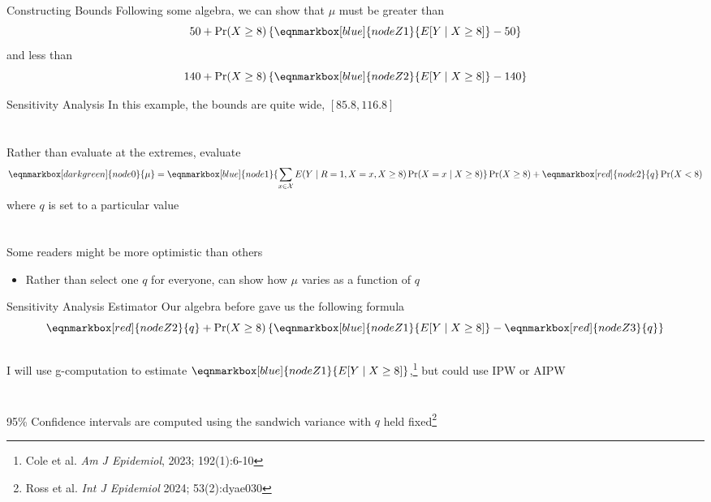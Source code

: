 \documentclass[aspectratio=169]{beamer}
\begin{document}
\begin{frame}{Constructing Bounds}
	Following some algebra, we can show that $\mu$ must be greater than
	$$ 50 + \Pr(X \ge 8)\left\{\eqnmarkbox[blue]{nodeZ1}{E[Y \mid X \ge 8]} - 50\right\}$$  
	and less than
	$$140 + \Pr(X \ge 8)\left\{\eqnmarkbox[blue]{nodeZ2}{E[Y \mid X \ge 8]} - 140\right\}$$ 
\end{frame}

\begin{frame}{Sensitivity Analysis}
	In this example, the bounds are quite wide, $[85.8, 116.8]$
	~\\~\\~\\
	Rather than evaluate at the extremes, evaluate
	\begin{equation*}
		\eqnmarkbox[darkgreen]{node0}{\mu} = \eqnmarkbox[blue]{node1}{ \sum_{x \in \mathcal{X}} E(Y \mid R=1, X=x, X \ge 8) \Pr(X=x \mid X \ge 8)} \Pr(X \ge 8) + \eqnmarkbox[red]{node2}{q} \Pr(X < 8)
	\end{equation*}
	where $q$ is set to a particular value
	~\\~\\~\\
	Some readers might be more optimistic than others
	\begin{itemize}
		\item Rather than select one $q$ for everyone, can show how $\mu$ varies as a function of $q$
	\end{itemize}
\end{frame}

\begin{frame}{Sensitivity Analysis Estimator}
	Our algebra before gave us the following formula
	\begin{equation*}
		\eqnmarkbox[red]{nodeZ2}{q} + \Pr(X \ge 8)\left\{\eqnmarkbox[blue]{nodeZ1}{E[Y \mid X \ge 8]} - \eqnmarkbox[red]{nodeZ3}{q}\right\}
	\end{equation*}
	~\\
	I will use g-computation to estimate $\eqnmarkbox[blue]{nodeZ1}{E[Y \mid X \ge 8]}$,\footnote[frame]{Cole et al. \textit{Am J Epidemiol}, 2023; 192(1):6-10} but could use IPW or AIPW
	~\\~\\~\\
	95\% Confidence intervals are computed using the sandwich variance with $q$ held fixed\footnote[frame]{Ross et al. \textit{Int J Epidemiol} 2024; 53(2):dyae030}
\end{frame}
\end{document}
